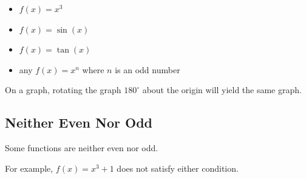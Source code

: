 \begin{itemize}

  \item \( f(x) = x^3 \)  
  \item \( f(x) = \sin(x) \)  
  \item \( f(x) = \tan(x) \)  
  \item any \( f(x) = x^n \) where \( n \) is an odd number
\end{itemize} 

On a graph, rotating the graph $180^\circ$ about the origin will yield the same graph.
\subsection{Neither Even Nor Odd}
Some functions are neither even nor odd. 

For example, \( f(x) = x^3 + 1 \) does not satisfy either condition.
